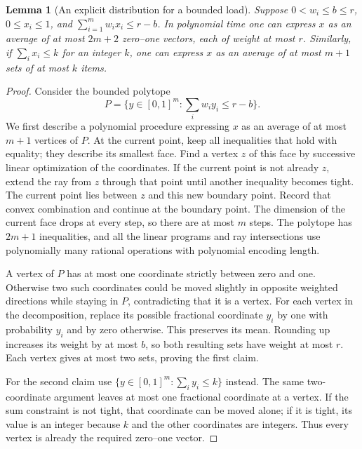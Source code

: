 \documentclass[11pt]{article}
\newtheorem{lemma}[theorem]{Lemma}
\theoremstyle{definition}\newtheorem{algorithm}{Algorithm}[section]
\numberwithin{equation}{section}
\theoremstyle{remark}\newtheorem*{remark}{Remark}
\begin{document}
\begin{lemma}[An explicit distribution for a bounded load]
\label{lem:algorithmic-local-load}
Suppose $0<w_i\le b\le r$, $0\le x_i\le1$, and
$\sum_{i=1}^m w_ix_i\le r-b$.
In polynomial time one can express $x$ as an average of at most
$2m+2$ zero--one vectors, each of weight at most $r$.
Similarly, if $\sum_i x_i\le k$ for an integer $k$, one can express
$x$ as an average of at most $m+1$ sets of at most $k$ items.
\end{lemma}
\begin{proof}
Consider the bounded polytope
\[
 P=\{y\in[0,1]^m:\textstyle\sum_i w_iy_i\le r-b\}.
\]
We first describe a polynomial procedure expressing $x$ as an average
of at most $m+1$ vertices of $P$. At the current point, keep all
inequalities that hold with equality; they describe its smallest face.
Find a vertex $z$ of this face by successive linear optimization of
the coordinates. If the current point is not already $z$, extend the
ray from $z$ through that point until another inequality becomes tight.
The current point lies between $z$ and this new boundary point.
Record that convex combination and continue at the boundary point.
The dimension of the current face drops at every step, so there are
at most $m$ steps. The polytope has $2m+1$ inequalities, and all the
linear programs and ray intersections use polynomially many rational
operations with polynomial encoding length.

A vertex of $P$ has at most one coordinate strictly between zero and
one. Otherwise two such coordinates could be moved slightly in opposite
weighted directions while staying in $P$, contradicting that it is a
vertex. For each vertex in the decomposition, replace its possible
fractional coordinate $y_i$ by one with probability $y_i$ and by zero
otherwise. This preserves its mean. Rounding up increases its weight
by at most $b$, so both resulting sets have weight at most $r$.
Each vertex gives at most two sets, proving the first claim.

For the second claim use
$\{y\in[0,1]^m:\sum_i y_i\le k\}$ instead.
The same two-coordinate argument leaves at most one fractional
coordinate at a vertex. If the sum constraint is not tight, that
coordinate can be moved alone; if it is tight, its value is an integer
because $k$ and the other coordinates are integers. Thus every vertex
is already the required zero--one vector.
\end{proof}
\end{document}
